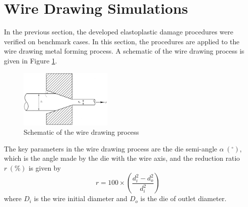 \documentclass[sn-mathphys,Numbered,draft]{sn-jnl}%
\begin{document}
\section{Wire Drawing Simulations}

In the previous section, the developed elastoplastic damage procedures were verified on benchmark cases.
In this section, the procedures are applied to the wire drawing metal forming process.
A schematic of the wire drawing process is given in Figure \ref{fig:wireDrawing}.
\begin{figure}[htb]
\begin{center}
	\includegraphics[width=0.4\textwidth]{./Figures/SimulationAndAnalysis/modelCompare/drawingSchematic.png}
	\caption{Schematic of the wire drawing process}
	\label{fig:wireDrawing}
\end{center}
\end{figure}
The key parameters in the wire drawing process are the die semi-angle $\alpha\ (^{\circ})$, which is the angle made by the die with the wire axis, and the reduction ratio $r\ (\%)$ is given by
\begin{equation}
    r = 100 \times \left(\frac{d_i^2 - d_o^2}{d_i^2}\right)
\end{equation}
where $D_i$ is the wire initial diameter and $D_o$ is the die of outlet diameter.

\end{document}
